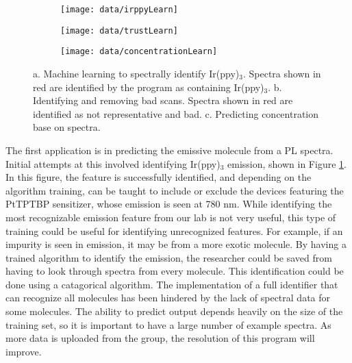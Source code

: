 \documentclass[../thesis.tex]{subfiles}
\begin{document}
\begin{figure}[ht]
\centering
    \begin{subfigure}{.3\textwidth}
    \texttt{[image: data/irppyLearn]}
    \caption{}
    \label{fig:data_ml_irppy}\par\vfill
    \end{subfigure}
    \begin{subfigure}{.3\textwidth}
    \texttt{[image: data/trustLearn]}
    \caption{}
    \label{fig:data_ml_trust}\par\vfill
    \end{subfigure}
    \begin{subfigure}{.3\textwidth}
    \texttt{[image: data/concentrationLearn]}
    \caption{}
    \label{fig:data_ml_concentration}\par\vfill
    \end{subfigure}
\caption{  a. Machine learning to spectrally identify Ir(ppy)$_3$.  Spectra shown in red are identified by the program as containing Ir(ppy)$_3$. b. Identifying and removing bad \eqe scans.  Spectra shown in red are identified as not representative and bad.  c. Predicting concentration base on spectra.}
\end{figure}

The first application is in predicting the emissive molecule from a PL spectra.
Initial attempts at this involved identifying Ir(ppy)$_3$ emission, shown in Figure \ref{fig:data_ml_irppy}.
In this figure, the \irppy feature is successfully identified, and depending on the algorithm training, can be taught to include or exclude the devices featuring the PtTPTBP sensitizer, whose emission is seen at 780 nm.
While identifying the most recognizable emission feature from our lab is not very useful, this type of training could be useful for identifying unrecognized features.
For example, if an impurity is seen in emission, it may be from a more exotic molecule.  
By having a trained algorithm to identify the emission, the researcher could be saved from having to look through spectra from every molecule.
This identification could be done using a catagorical algorithm.
The implementation of a full identifier that can recognize all molecules has been hindered by the lack of spectral data for some molecules.
The ability to predict output depends heavily on the size of the training set, so it is important to have a large number of example spectra.
As more data is uploaded from the group, the resolution of this program will improve.
\end{document}
